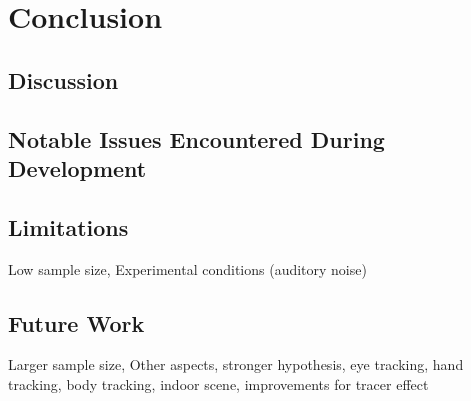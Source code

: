 \chapter{Conclusion}

\section{Discussion}

\section{Notable Issues Encountered During Development}

\section{Limitations}
Low sample size, Experimental conditions (auditory noise)

\section{Future Work}
Larger sample size, Other aspects, stronger hypothesis, eye tracking, hand tracking, body tracking, indoor scene, improvements for tracer effect
